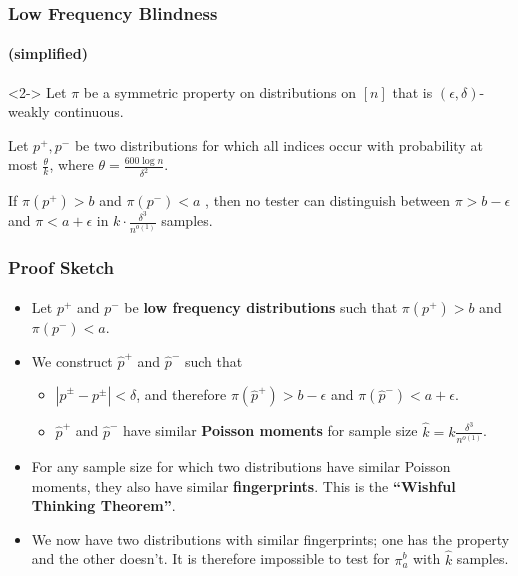 \documentclass[handout]{beamer}
\begin{document}
\begin{frame}
  \frametitle{Low Frequency Blindness} \framesubtitle{(simplified)}
  \begin{theorem}<2->
    Let $\pi$ be a symmetric property on distributions on $[n]$ that
    is $(\epsilon,\delta)$-weakly continuous.

    Let $p^+,p^-$ be two distributions for which all indices occur
    with probability at most $\frac{\theta}{k}$, where
    $\theta=\frac{600\log n}{\delta^2}$.

    If $\pi(p^+)>b$ and $\pi(p^-)<a$ , then no tester can distinguish
    between $\pi>b-\epsilon$ and $\pi<a+\epsilon$ in $k\cdot
    \frac{\delta^3}{n^{o(1)}}$ samples.
  \end{theorem}
\end{frame}


\begin{frame}
  \frametitle{Proof Sketch} \framesubtitle{}

  \begin{itemize}
  \item<1-> Let $p^+$ and $p^-$ be {\bf low frequency distributions}
    such that $\pi(p^+)>b$ and $\pi(p^-)<a$.
  \item<2-> We construct $\hat{p}^+$ and $\hat{p}^-$ such that
    \begin{itemize}
    \item<3-> $|\hat{p}^\pm-p^\pm|<\delta$, and therefore
      $\pi(\hat{p}^+)>b-\epsilon$ and
      $\pi(\hat{p}^-)<a+\epsilon$.
    \item<4->$\hat{p}^+$ and $\hat{p}^-$ have similar {\bf Poisson
        moments} for sample size $\hat{k}=k\frac{\delta^3}{n^{o(1)}}$.
    \end{itemize}
  \item<5-> For any sample size for which two distributions have similar
    Poisson moments, they also have similar {\bf fingerprints}. This
    is the {\bf ``Wishful Thinking Theorem''}.
  \item<6-> We now have two distributions with similar fingerprints;
    one has the property and the other doesn't. It is therefore
    impossible to test for $\pi_a^b$ with $\hat{k}$ samples.
  \end{itemize}

\end{frame}
\end{document}

